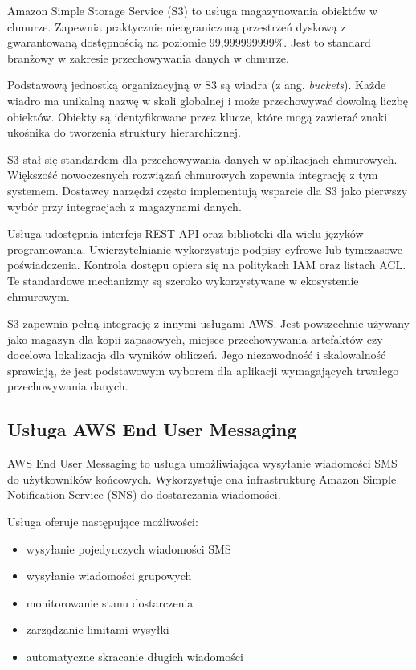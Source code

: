 Amazon Simple Storage Service (S3) to usługa magazynowania obiektów w chmurze.
Zapewnia praktycznie nieograniczoną przestrzeń dyskową z gwarantowaną dostępnością na poziomie 99,999999999\%.
Jest to standard branżowy w zakresie przechowywania danych w chmurze.

Podstawową jednostką organizacyjną w S3 są wiadra (z ang. \textit{buckets}). Każde wiadro ma unikalną nazwę w skali globalnej i może przechowywać dowolną liczbę obiektów.
Obiekty są identyfikowane przez klucze, które mogą zawierać znaki ukośnika do tworzenia struktury hierarchicznej.

S3 stał się standardem dla przechowywania danych w aplikacjach chmurowych.
Większość nowoczesnych rozwiązań chmurowych zapewnia integrację z tym systemem.
Dostawcy narzędzi często implementują wsparcie dla S3 jako pierwszy wybór przy integracjach z magazynami danych.

Usługa udostępnia interfejs REST API oraz biblioteki dla wielu języków programowania.
Uwierzytelnianie wykorzystuje podpisy cyfrowe lub tymczasowe poświadczenia.
Kontrola dostępu opiera się na politykach IAM oraz listach ACL. Te standardowe mechanizmy są szeroko wykorzystywane w ekosystemie chmurowym.

S3 zapewnia pełną integrację z innymi usługami AWS. Jest powszechnie używany jako magazyn dla kopii zapasowych, miejsce przechowywania artefaktów czy docelowa lokalizacja dla wyników obliczeń.
Jego niezawodność i skalowalność sprawiają, że jest podstawowym wyborem dla aplikacji wymagających trwałego przechowywania danych.

\subsection{Usługa AWS End User Messaging}

AWS End User Messaging to usługa umożliwiająca wysyłanie wiadomości SMS do użytkowników końcowych.
Wykorzystuje ona infrastrukturę Amazon Simple Notification Service (SNS) do dostarczania wiadomości.

Usługa oferuje następujące możliwości:
\begin{itemize}
    \item wysyłanie pojedynczych wiadomości SMS
    \item wysyłanie wiadomości grupowych
    \item monitorowanie stanu dostarczenia
    \item zarządzanie limitami wysyłki
    \item automatyczne skracanie długich wiadomości
\end{itemize}

